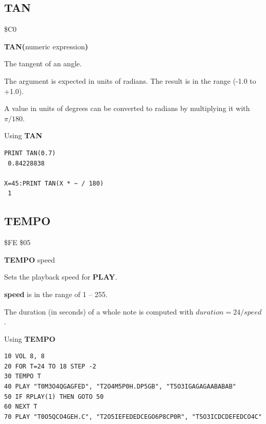 \subsection{TAN}
\begin{description}[leftmargin=2cm,style=nextline]
\item [Token:]    \$C0

\item [Format:]   {\bf TAN(}numeric expression{\bf)}

\item [Returns:]  The tangent of an angle.

                  The argument is expected in units of radians. The result is in the range (-1.0 to +1.0).

\item [Remarks:]  A value in units of degrees can be converted to radians by multiplying it with $\pi/180$.

\item [Example:]  Using {\bf TAN}

\begin{tcolorbox}[colback=black,coltext=white]
\verbatimfont{\codefont}
\begin{verbatim}
PRINT TAN(0.7)
 0.84228838

X=45:PRINT TAN(X * ~ / 180)
 1
\end{verbatim}
\end{tcolorbox}
\end{description}


\newpage
\subsection{TEMPO}
\begin{description}[leftmargin=2cm,style=nextline]
\item [Token:]    \$FE \$05

\item [Format:]   {\bf TEMPO} speed

\item [Usage:]    Sets the playback speed for {\bf PLAY}.

                  {\bf speed} is in the range of 1 -- 255.

                  The duration (in seconds) of a whole note is computed with $duration = 24 / speed$.

\item [Example:]  Using {\bf TEMPO}

\begin{tcolorbox}[colback=black,coltext=white]
\verbatimfont{\codefont}
\begin{verbatim}
10 VOL 8, 8
20 FOR T=24 TO 18 STEP -2
30 TEMPO T
40 PLAY "T0M3O4QGAGFED", "T2O4M5P0H.DP5GB", "T5O3IGAGAGAABABAB"
50 IF RPLAY(1) THEN GOTO 50
60 NEXT T
70 PLAY "T0O5QCO4GEH.C", "T2O5IEFEDEDCEGO6P8CP0R", "T5O3ICDCDEFEDCO4C"
\end{verbatim}
\end{tcolorbox}
\end{description}

